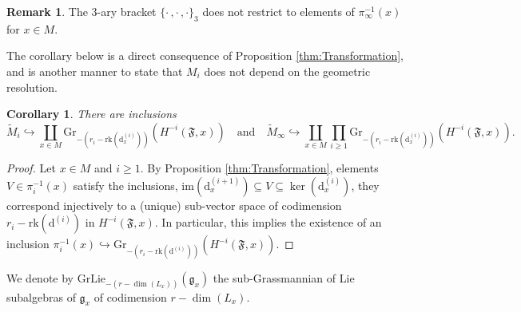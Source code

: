 \documentclass[10pt]{article}
\theoremstyle{plain}
\newtheorem{corollary}[lemma]{Corollary}
\theoremstyle{definition}
\newtheorem{remark}[lemma]{Remark}
\theoremstyle{remark}
\newcommand{\dd}{\mathrm{d}}
\begin{document}
\begin{remark}
    The $3$-ary bracket $\{\cdot\,,\cdot\,,\cdot\}_3$ does not restrict to elements of $\pi_\infty^{-1}(x)$ for $x\in M$.
\end{remark}
The corollary below is a direct consequence of Proposition \ref{thm:Transformation}, and is another manner to state that $M_i$ does not depend on the geometric resolution.
\begin{corollary}\label{cor:independence}
There are inclusions
\begin{equation}
    \widetilde M_i\hookrightarrow \coprod_{x\in M}\mathrm{Gr}_{-\left(r_i-\mathrm{rk}\left(\dd^{(i)}_x\right)\right)}(H^{-i}(\mathfrak{F},{x}))\quad\text{and}\quad\widetilde M_\infty\hookrightarrow \coprod_{x\in M}\prod_{ i\geq 1}\mathrm{Gr}_{-\left(r_i-\mathrm{rk}\left(\dd^{(i)}_x\right)\right)}(H^{-i}(\mathfrak{F},{x})).  
\end{equation}
\end{corollary}
\begin{proof}
Let $x\in M$ and $i\geq 1$.
By Proposition \ref{thm:Transformation}, elements $V\in \pi_i^{-1}(x)$ satisfy the inclusions, $\mathrm{im}(\dd^{(i+1)}_{x})\subseteq V \subseteq \ker(\dd^{(i)}_x)$, they correspond injectively to a (unique) sub-vector space of codimension $r_i-\mathrm{rk}(\dd^{(i)})$ in $H^{-i}(\mathfrak{F},{x})$. In particular, this implies the existence
of an inclusion $\pi_i^{-1}(x)\hookrightarrow \mathrm{Gr}_{-\left(r_i-\mathrm{rk}(\dd^{(i)})\right)}(H^{-i}(\mathfrak{F},{x}))$.
\end{proof}

We denote by $\mathrm{GrLie}_{-\left(r-\dim(L_x)\right)}(\mathfrak{g}_x)$ the sub-Grassmannian of Lie subalgebras of $\mathfrak{g}_x$ of codimension $r-\dim(L_x)$.
\end{document}

